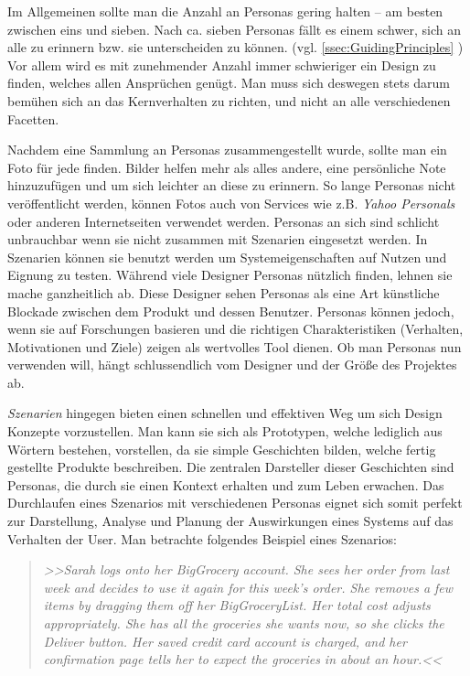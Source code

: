 \medskip Im Allgemeinen sollte man die Anzahl an Personas gering halten – am besten zwischen eins und sieben. Nach ca. sieben Personas fällt es einem schwer, sich an alle zu erinnern bzw. sie unterscheiden zu können. (vgl. \ref{ssec:GuidingPrinciples} ) Vor allem wird es mit zunehmender Anzahl immer schwieriger ein Design zu finden, welches allen Ansprüchen genügt. Man muss sich deswegen stets darum bemühen sich an das Kernverhalten zu richten, und nicht an alle verschiedenen Facetten.

\medskip Nachdem eine Sammlung an Personas zusammengestellt wurde, sollte man ein Foto für jede finden. Bilder helfen mehr als alles andere, eine persönliche Note hinzuzufügen und um sich leichter an diese zu erinnern. So lange Personas nicht veröffentlicht werden, können Fotos auch von Services wie z.B. \emph{Yahoo Personals} oder anderen Internetseiten verwendet werden. Personas an sich sind schlicht unbrauchbar wenn sie nicht zusammen mit Szenarien eingesetzt werden. In Szenarien können sie benutzt werden um Systemeigenschaften auf Nutzen und Eignung zu testen. 
Während viele Designer Personas nützlich finden, lehnen sie mache ganzheitlich ab. Diese Designer sehen Personas als eine Art künstliche Blockade zwischen dem Produkt und dessen Benutzer. Personas können jedoch, wenn sie auf Forschungen basieren und die richtigen Charakteristiken (Verhalten, Motivationen und Ziele) zeigen als wertvolles Tool dienen. Ob man Personas nun verwenden will, hängt schlussendlich vom Designer und der Größe des Projektes ab. \citep{Saffer:2007}

\medskip \emph{Szenarien} hingegen bieten einen schnellen und effektiven Weg um sich Design Konzepte vorzustellen. Man kann sie sich als Prototypen, welche lediglich aus Wörtern bestehen, vorstellen, da sie simple Geschichten bilden, welche fertig gestellte Produkte beschreiben. Die zentralen Darsteller dieser Geschichten sind Personas, die durch sie einen Kontext erhalten und zum Leben erwachen. Das Durchlaufen eines Szenarios mit verschiedenen Personas eignet sich somit perfekt zur Darstellung, Analyse und Planung der Auswirkungen eines Systems auf das Verhalten der User. Man betrachte folgendes Beispiel eines Szenarios:

\begin{quote}
	\textsl{>>Sarah logs onto her BigGrocery account. She sees her order from last week and decides to use it again for this week's order. She removes a few items by dragging them off her BigGroceryList. Her total cost adjusts appropriately. She has all the groceries she wants now, so she clicks the Deliver button. Her saved credit card account is charged, and her confirmation page tells her to expect the groceries in about an hour.<<}
	 \begin{flushright} \citep{Saffer:2007} \end{flushright}
\end{quote}

